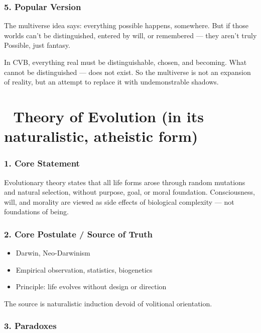 \documentclass[12pt]{article}
\begin{document}
\subsubsection*{5. Popular Version}

The multiverse idea says: everything possible happens, somewhere. But if those worlds can’t be distinguished, entered by will, or remembered — they aren’t truly Possible, just fantasy.

In CVB, everything real must be distinguishable, chosen, and becoming. What cannot be distinguished — does not exist. So the multiverse is not an expansion of reality, but an attempt to replace it with undemonstrable shadows.


\section*{🔷 Theory of Evolution (in its naturalistic, atheistic form)}

\subsubsection*{1. Core Statement}

Evolutionary theory states that all life forms arose through random mutations and natural selection, without purpose, goal, or moral foundation. Consciousness, will, and morality are viewed as side effects of biological complexity — not foundations of being.

\subsubsection*{2. Core Postulate / Source of Truth}

\begin{itemize}
\item Darwin, Neo-Darwinism
\item Empirical observation, statistics, biogenetics
\item Principle: life evolves without design or direction
\end{itemize}

The source is naturalistic induction devoid of volitional orientation.

\subsubsection*{3. Paradoxes}
\end{document}
